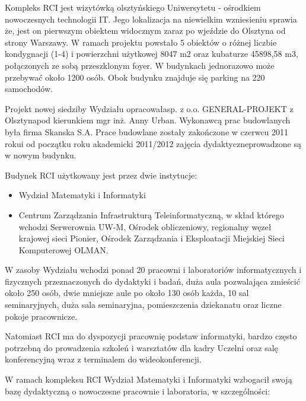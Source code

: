 ﻿\documentclass[a4paper,12pt]{article}
\begin{document}
Kompleks RCI jest wizytówką olsztyńskiego Uniwersytetu - ośrodkiem nowoczesnych technologii IT. Jego
lokalizacja na niewielkim wzniesieniu sprawia że, jest on pierwszym obiektem widocznym zaraz po wjeździe
do Olsztyna od strony Warszawy. W ramach projektu powstało 5 obiektów o różnej liczbie kondygnacji (1-4) i
powierzchni użytkowej 8047 m2 oraz kubaturze 45898,58 m3, połączonych ze sobą przeszklonym foyer. W
budynkach jednorazowo może przebywać około 1200 osób. Obok budynku znajduje się parking na 220
samochodów.
\par

Projekt nowej siedziby Wydziału opracowała\newline sp. z o.o. GENERAL-PROJEKT z Olsztyna\newline pod kierunkiem mgr
inż. Anny Urban. Wykonawcą prac budowlanych była firma Skanska S.A. Prace budowlane zostały
zakończone w czerwcu 2011 roku\newline i od początku roku akademicki 2011/2012 zajęcia dydaktyczne\newline prowadzone
są w nowym budynku.
\par

Budynek RCI użytkowany jest przez dwie instytucje:
\begin{itemize}
\item Wydział Matematyki i Informatyki
\item Centrum Zarządzania Infrastrukturą Teleinformatyczną, w skład którego wchodzi Serwerownia UW-M,
 Ośrodek obliczeniowy, regionalny węzeł krajowej sieci Pionier, Ośrodek Zarządzania i Eksploatacji
Miejskiej Sieci Komputerowej OLMAN.
\end{itemize}
W zasoby Wydziału wchodzi ponad 20 pracowni i laboratoriów informatycznych i fizycznych przeznaczonych
do dydaktyki i badań, duża aula pozwalająca zmieścić około 250 osób, dwie mniejsze aule po około 130 osób
każda, 10 sal seminaryjnych, duża sala seminaryjna, pomieszczenia dziekanatu oraz liczne pokoje pracownicze.
\par

Natomiast RCI ma do dyspozycji pracownię podstaw informatyki, bardzo często potrzebną do prowadzenia
szkoleń i warsztatów dla kadry Uczelni oraz salę konferencyjną wraz z terminalem do wideokonferencji.
\par

W ramach kompleksu RCI Wydział Matematyki i Informatyki wzbogacił swoją bazę dydaktyczną o
nowoczesne pracownie i laboratoria, w szczególności:
\par
\end{document}
